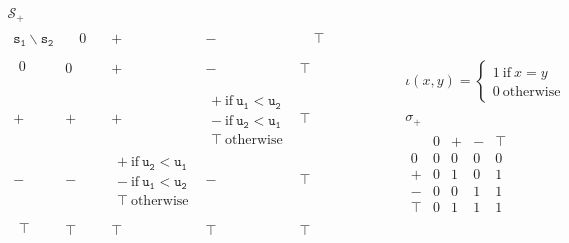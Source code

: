 \documentclass[handout,t]{beamer}
\begin{document}
\begin{frame}
\tiny\color{blue}
$$
\begin{array}{ccc}
\mathcal{S}_+&&
\\
\begin{array}{c|c|c|c|c}
 \mathtt{s_1} \backslash \mathtt{s_2}
      &\quad 0 \quad& + & - & \quad\top\quad \\
\hline	  
\begin{array}{c}
\\ 0\\ \\
\end{array}    & 0 & + & - & \top \\
\hline
+    & + & + & 
\begin{array}{c}
+ \ \text{if}\ \mathtt{u_1}<\mathtt{u_2}\\
- \ \text{if}\ \mathtt{u_2}<\mathtt{u_1}\\
\top\ \text{otherwise}
\end{array}&\top\\
\hline
-     & - & 
\begin{array}{c}
+ \ \text{if}\ \mathtt{u_2}<\mathtt{u_1}\\
- \ \text{if}\ \mathtt{u_1}<\mathtt{u_2}\\
\top\ \text{otherwise}
\end{array}
 & - &\top\\
\hline
\begin{array}{c}
\\ \top\\ \\
\end{array} &\top &\top&\top&\top
\end{array}
&\hspace{1cm}&
\begin{array}{c}
  \iota(x,y)=\left\{
\begin{array}{l}
  1\ \text{if}\ x=y\\
  0\ \text{otherwise}
\end{array}\right.
\\
\\
\sigma_+\\
\begin{array}{c|cccc}
  & 0 & + & - & \top \\
  \hline
0& 0 & 0  & 0 & 0 \\
+& 0 & 1 & 0 & 1\\
-& 0 & 0 & 1 & 1\\
\top&0&1 & 1 &1\\
\end{array}
\end{array}
\end{array}
$$
\end{frame}
\end{document}
